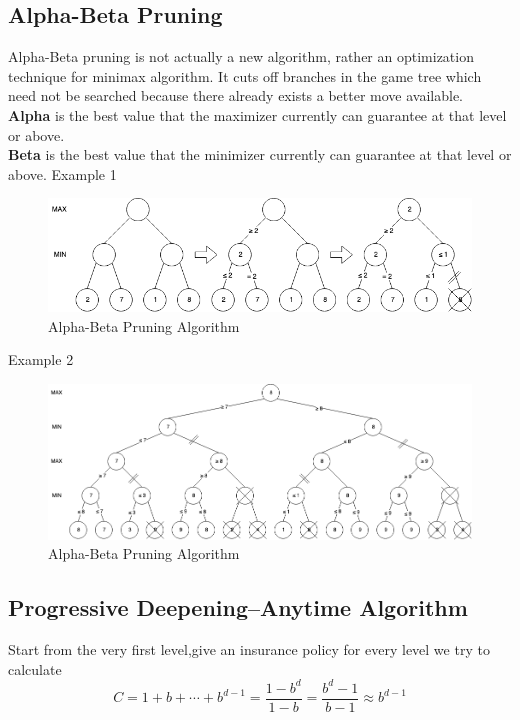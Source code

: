 \documentclass[12pt]{book}
\begin{document}
\subsection{Alpha-Beta Pruning}
\indent Alpha-Beta pruning is not actually a new algorithm, rather an optimization technique for minimax algorithm. It cuts off branches in the game tree which need not be searched because there already exists a better move available.\\
\indent \textbf{Alpha} is the best value that the maximizer currently can guarantee at that level or above.\\
\indent \textbf{Beta} is the best value that the minimizer currently can guarantee at that level or above.
\newpage
Example 1 
\begin{figure}[ht]
		\centering
		\includegraphics[scale=0.65]{Figure/Figure6_2.png}
		\caption{Alpha-Beta Pruning Algorithm}
	\end{figure}
\newline
\indent Example 2 
\begin{figure}[ht]
	\centering
	\includegraphics[scale=0.5]{Figure/Figure6_3.png}
	\caption{Alpha-Beta Pruning Algorithm}
\end{figure}

\subsection{Progressive Deepening--Anytime Algorithm}
Start from the very first level,give an insurance policy for every level we try to calculate
$$C=1+b+\cdots+b^{d-1} = \frac{1-b^d}{1-b}=\frac{b^d-1}{b-1}\approx b^{d-1}$$
\end{document}
